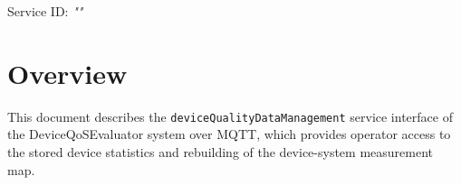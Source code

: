 \documentclass[a4paper]{arrowhead}
\begin{document}
\sloppy

\ArrowheadSetup

\begin{center}
  \vspace*{1cm}
  \huge{\arrowtitle}

  \vspace*{0.2cm}
  \LARGE{\arrowtype}
  \vspace*{1cm}

  \Large{Service ID: \textit{"\arrowid"}}

  \vspace*{\fill}


  \vspace*{1cm}
  \vspace*{\fill}

  \begin{abstract}
    This document describes the MQTT protocol with TLS payload security and JSON payload encoding variant of the \texttt{device\allowbreak{}Quality\allowbreak{}Data\allowbreak{}Management} service of the DeviceQoSEvaluator system.
  \end{abstract}

  \vspace*{1cm}
\end{center}

\newpage

\tableofcontents
\newpage

\section{Overview}
\label{sec:overview}

This document describes the \texttt{device\allowbreak{}Quality\allowbreak{}Data\allowbreak{}Management} service interface of the DeviceQoSEvaluator system over MQTT, which provides operator access to the stored device statistics and rebuilding of the device-system measurement map.
\end{document}
